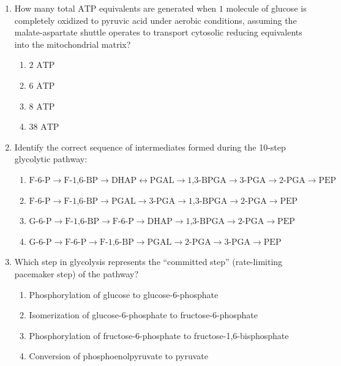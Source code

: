 \documentclass[11pt, a4paper]{article}
\begin{document}
\begin{enumerate}[label=\textbf{\arabic*.}]
\item How many total $\text{ATP}$ equivalents are generated when $1\text{ molecule}$ of glucose is completely oxidized to pyruvic acid under aerobic conditions, assuming the malate-aspartate shuttle operates to transport cytosolic reducing equivalents into the mitochondrial matrix?
\begin{enumerate}[label=(\Alph*)]
    \item $2\text{ ATP}$
    \item $6\text{ ATP}$
    \item $8\text{ ATP}$
    \item $38\text{ ATP}$
\end{enumerate}

\item Identify the correct sequence of intermediates formed during the 10-step glycolytic pathway:
\begin{enumerate}[label=(\Alph*)]
    \item $\text{F-6-P} \rightarrow \text{F-1,6-BP} \rightarrow \text{DHAP} \leftrightarrow \text{PGAL} \rightarrow \text{1,3-BPGA} \rightarrow \text{3-PGA} \rightarrow \text{2-PGA} \rightarrow \text{PEP}$
    \item $\text{F-6-P} \rightarrow \text{F-1,6-BP} \rightarrow \text{PGAL} \rightarrow \text{3-PGA} \rightarrow \text{1,3-BPGA} \rightarrow \text{2-PGA} \rightarrow \text{PEP}$
    \item $\text{G-6-P} \rightarrow \text{F-1,6-BP} \rightarrow \text{F-6-P} \rightarrow \text{DHAP} \rightarrow \text{1,3-BPGA} \rightarrow \text{2-PGA} \rightarrow \text{PEP}$
    \item $\text{G-6-P} \rightarrow \text{F-6-P} \rightarrow \text{F-1,6-BP} \rightarrow \text{PGAL} \rightarrow \text{2-PGA} \rightarrow \text{3-PGA} \rightarrow \text{PEP}$
\end{enumerate}

\item Which step in glycolysis represents the ``committed step'' (rate-limiting pacemaker step) of the pathway?
\begin{enumerate}[label=(\Alph*)]
    \item Phosphorylation of glucose to glucose-6-phosphate
    \item Isomerization of glucose-6-phosphate to fructose-6-phosphate
    \item Phosphorylation of fructose-6-phosphate to fructose-1,6-bisphosphate
    \item Conversion of phosphoenolpyruvate to pyruvate
\end{enumerate}


\end{enumerate}
\end{document}
